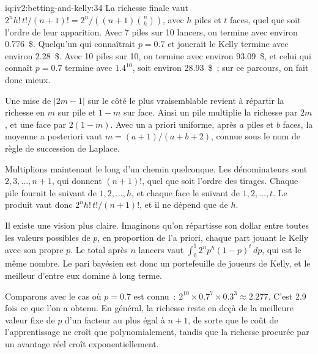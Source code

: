 \begin{solution}{iq:iv2:betting-and-kelly:34}
La richesse finale vaut $2^n h!\,t!/(n + 1)! = 2^n/\left((n + 1)\binom{n}{h}\right)$, avec $h$ piles et $t$ faces, quel que soit l'ordre de leur apparition. Avec 7 piles sur 10 lancers, on termine avec environ 0.776~\$. Quelqu'un qui connaîtrait $p = 0.7$ et jouerait le Kelly termine avec environ 2.28~\$. Avec 10 piles sur 10, on termine avec environ 93.09~\$, et celui qui connaît $p = 0.7$ termine avec $1.4^{10}$, soit environ 28.93~\$~; sur ce parcours, on fait donc mieux.

Une mise de $|2m - 1|$ sur le côté le plus vraisemblable revient à répartir la richesse en $m$ sur pile et $1 - m$ sur face. Ainsi un pile multiplie la richesse par $2m$, et une face par $2(1 - m)$. Avec un a priori uniforme, après $a$ piles et $b$ faces, la moyenne a posteriori vaut $m = (a + 1)/(a + b + 2)$, connue sous le nom de règle de succession de Laplace.

Multiplions maintenant le long d'un chemin quelconque. Les dénominateurs sont $2, 3, \ldots, n + 1$, qui donnent $(n + 1)!$, quel que soit l'ordre des tirages. Chaque pile fournit le suivant de $1, 2, \ldots, h$, et chaque face le suivant de $1, 2, \ldots, t$. Le produit vaut donc $2^n h!\,t!/(n + 1)!$, et il ne dépend que de $h$.

Il existe une vision plus claire. Imaginons qu'on répartisse son dollar entre toutes les valeurs possibles de $p$, en proportion de l'a priori, chaque part jouant le Kelly avec son propre $p$. Le total après $n$ lancers vaut $\int_0^1 2^n p^h(1 - p)^t\,dp$, qui est le même nombre. Le pari bayésien est donc un portefeuille de joueurs de Kelly, et le meilleur d'entre eux domine à long terme.

Comparons avec le cas où $p = 0.7$ est connu~: $2^{10} \times 0.7^7 \times 0.3^3 \approx 2.277$. C'est 2.9 fois ce que l'on a obtenu. En général, la richesse reste en deçà de la meilleure valeur fixe de $p$ d'un facteur au plus égal à $n + 1$, de sorte que le coût de l'apprentissage ne croît que polynomialement, tandis que la richesse procurée par un avantage réel croît exponentiellement.

\end{solution}

